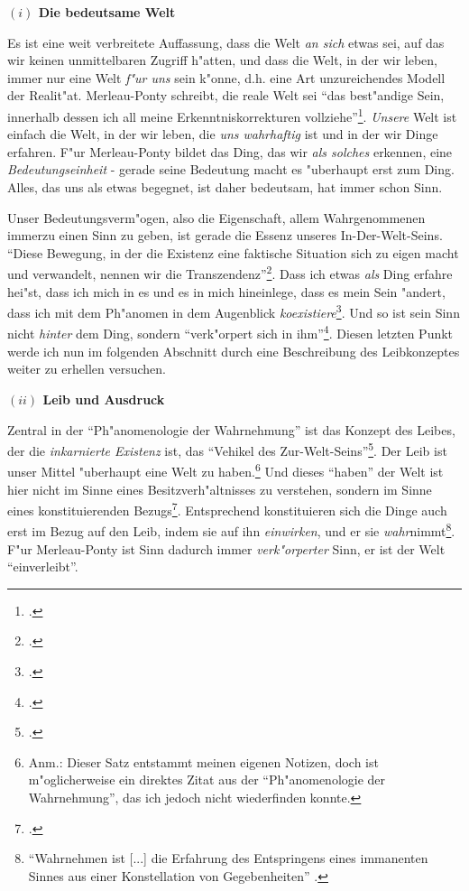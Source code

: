 \documentclass[a4paper, 12pt]{article}
\begin{document}
\begin{onehalfspace}
\vspace{5mm}

\noindent\textbf{$(i)$ Die bedeutsame Welt}

\noindent Es ist eine weit verbreitete Auffassung, dass die Welt \emph{an sich} etwas sei, auf das wir keinen unmittelbaren Zugriff h"atten, und dass die Welt, in der wir leben, immer nur eine Welt \emph{f"ur uns} sein k"onne, d.h. eine Art unzureichendes Modell der Realit"at. Merleau-Ponty schreibt, die reale Welt sei "`das best"andige Sein, innerhalb dessen ich all meine Erkenntniskorrekturen vollziehe"'\footnote{\cite[S. 379]{merleau1966phanomenologie}.}. \emph{Unsere} Welt ist einfach die Welt, in der wir leben, die \emph{uns wahrhaftig} ist und in der wir Dinge erfahren. F"ur Merleau-Ponty bildet das Ding, das wir \emph{als solches} erkennen, eine \emph{Bedeutungseinheit} - gerade seine Bedeutung macht es "uberhaupt erst zum Ding. Alles, das uns als etwas begegnet, ist daher bedeutsam, hat immer schon Sinn.

Unser Bedeutungsverm"ogen, also die Eigenschaft, allem Wahrgenommenen immerzu einen Sinn zu geben, ist gerade die Essenz unseres In-Der-Welt-Seins. "`Diese Bewegung, in der die Existenz eine faktische Situation sich zu eigen macht und verwandelt, nennen wir die Transzendenz"'\footnote{\cite[S. 202]{merleau1966phanomenologie}.}. Dass ich etwas \emph{als} Ding erfahre hei"st, dass ich mich in es und es in mich hineinlege, dass es mein Sein "andert, dass ich mit dem Ph"anomen in dem Augenblick \emph{koexistiere}\footnote{\cite[Vgl.][S. 368]{merleau1966phanomenologie}.}. Und so ist sein Sinn nicht \emph{hinter} dem Ding, sondern "`verk"orpert sich in ihm"'\footnote{\cite[S. 370]{merleau1966phanomenologie}.}. Diesen letzten Punkt werde ich nun im folgenden Abschnitt durch eine Beschreibung des Leibkonzeptes weiter zu erhellen versuchen. 

\vspace{5mm}

\noindent\textbf{$(ii)$ Leib und Ausdruck}

\noindent Zentral in der "`Ph"anomenologie der Wahrnehmung"' ist das Konzept des Leibes, der die \emph{inkarnierte Existenz} ist, das "`Vehikel des Zur-Welt-Seins"'\footnote{\cite[S. 106]{merleau1966phanomenologie}.}. Der Leib ist unser Mittel "uberhaupt eine Welt zu haben.\footnote{Anm.: Dieser Satz entstammt meinen eigenen Notizen, doch ist m"oglicherweise ein direktes Zitat aus der "`Ph"anomenologie der Wahrnehmung"', das ich jedoch nicht wiederfinden konnte.} Und dieses "`haben"' der Welt ist hier nicht im Sinne eines Besitzverh"altnisses zu verstehen, sondern im Sinne eines konstituierenden Bezugs\footnote{\cite[Vgl.][S. 207]{merleau1966phanomenologie}.}. Entsprechend konstituieren sich die Dinge auch erst im Bezug auf den Leib, indem sie auf ihn \emph{einwirken}, und er sie \emph{wahr}nimmt\footnote{"`Wahrnehmen ist [...] die Erfahrung des Entspringens eines immanenten Sinnes aus einer Konstellation von Gegebenheiten"' \citep[S. 42]{merleau1966phanomenologie}.}. F"ur Merleau-Ponty ist Sinn dadurch immer \emph{verk"orperter} Sinn, er ist der Welt "`einverleibt"'.


\end{onehalfspace}
\end{document}

